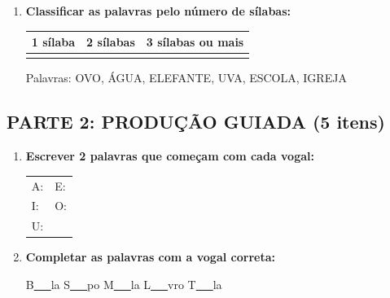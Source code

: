 \begin{exercicio}
\begin{enumerate}
  \item \textbf{Classificar as palavras pelo número de sílabas:}
  \begin{center}
  \begin{tabular}{|c|c|c|}
  \hline
  1 sílaba & 2 sílabas & 3 sílabas ou mais \\
  \hline
  \underline{\hspace{3cm}} & \underline{\hspace{3cm}} & \underline{\hspace{3cm}} \\
  \hline
  \end{tabular}
  \end{center}
  Palavras: OVO, ÁGUA, ELEFANTE, UVA, ESCOLA, IGREJA
\end{enumerate}

\subsection*{PARTE 2: PRODUÇÃO GUIADA (5 itens)}

\begin{enumerate}[resume]
  \item \textbf{Escrever 2 palavras que começam com cada vogal:}
  \begin{center}
  \begin{tabular}{ll}
  A: \underline{\hspace{3cm}} \underline{\hspace{3cm}} &
  E: \underline{\hspace{3cm}} \underline{\hspace{3cm}} \\[0.5em]
  I: \underline{\hspace{3cm}} \underline{\hspace{3cm}} &
  O: \underline{\hspace{3cm}} \underline{\hspace{3cm}} \\[0.5em]
  U: \underline{\hspace{3cm}} \underline{\hspace{3cm}} &
  \end{tabular}
  \end{center}

  \item \textbf{Completar as palavras com a vogal correta:}
  \begin{center}
  B\underline{~~~}la \quad S\underline{~~~}po \quad M\underline{~~~}la \quad L\underline{~~~}vro \quad T\underline{~~~}la
  \end{center}


\end{enumerate}
\end{exercicio}
